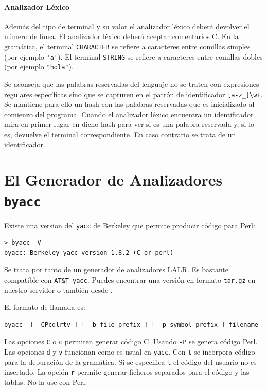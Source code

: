 \paragraph{Analizador Léxico}

Además del tipo de terminal y su valor el analizador
léxico deberá devolver el número de línea.
El analizador léxico deberá aceptar comentarios C.
En la gramática, el terminal \verb|CHARACTER| se refiere a 
caracteres entre comillas simples (por ejemplo \verb|'a'|).
El terminal \verb|STRING| se refiere a 
caracteres entre comillas dobles (por ejemplo \verb|"hola"|).

Se aconseja que las palabras reservadas del lenguaje
no se traten con expresiones regulares específicas sino que se
capturen en el patrón de identificador \verb|[a-z_]\w+|. 
Se mantiene para ello un hash con las palabras reservadas 
que es inicializado al comienzo del programa. Cuando 
el analizador léxico encuentra un identificador
mira en primer lugar en dicho hash 
para ver si es una palabra reservada y,
si lo es, devuelve el terminal correspondiente.
En caso contrario se trata de un identificador.


\section{El Generador de Analizadores {\tt byacc}}
Existe una version del \verb|yacc| de Berkeley que permite producir 
código para Perl:
\begin{verbatim}
> byacc -V
byacc: Berkeley yacc version 1.8.2 (C or perl)
\end{verbatim}
Se trata por tanto de un generador de analizadores LALR.
Es bastante compatible con \verb|AT&T yacc|. Puedes encontrar 
una versión en formato \verb|tar.gz| en nuestro servidor
o también desde 
.

El formato de llamada es:
\begin{verbatim}
byacc  [ -CPcdlrtv ] [ -b file_prefix ] [ -p symbol_prefix ] filename
\end{verbatim}

Las opciones \verb|C| o \verb|c| permiten generar código C. Usando \verb|-P|
se genera código Perl. Las opciones \verb|d| y \verb|v| funcionan como es usual en 
\verb|yacc|. Con \verb|t| se incorpora código para la depuración de la gramática.
Si se especifica \verb|l| el código del usuario no es insertado.
La opción \verb|r| permite generar ficheros separados para el código y las tablas. No la use
con Perl.

